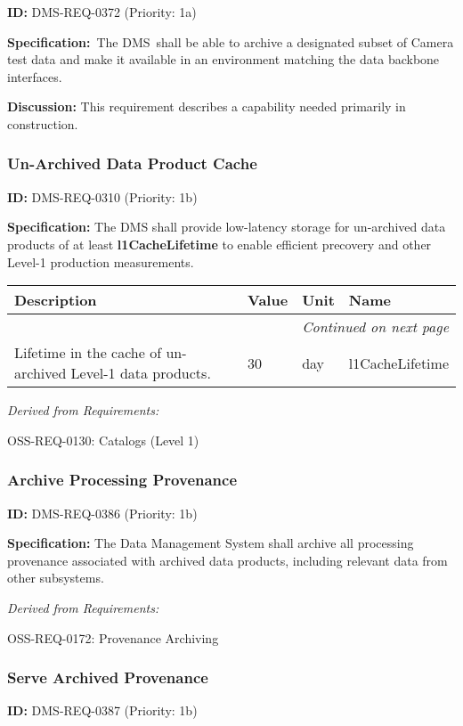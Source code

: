\documentclass[SE,toc,lsstdraft]{lsstdoc}
\makeatletter
\newcommand{\paramname}[1]{\hspace{0pt}#1}
\newcommand{\unitname}[1]{\hspace{0pt}#1}
\newenvironment{parameters}[0]{%
\setlength\LTleft{0pt}
\setlength\LTright{\fill}
\begin{small}
\begin{longtable}[]{|p{0.49\textwidth}|l|p{0.6in}|p{1.70in}@{}|}

\hline \textbf{Description} & \textbf{Value} & \textbf{Unit} & \textbf{Name} \\ \hline
\endhead

\hline \multicolumn{4}{r}{\emph{Continued on next page}} \\
\endfoot

\hline\hline
\endlastfoot
}{%
\hline
\end{longtable}
\end{small}
}
\makeatother
\begin{document}
\label{DMS-REQ-0372}
\textbf{ID:} DMS-REQ-0372 (Priority: 1a)

\textbf{Specification:} The DMS shall be able to archive a designated subset of Camera test data and make it available in an environment matching the data backbone interfaces.

\textbf{Discussion:}
This requirement describes a capability needed primarily in construction.

\subsubsection{Un-Archived Data Product Cache}

\label{DMS-REQ-0310}
\textbf{ID:} DMS-REQ-0310 (Priority: 1b)

\textbf{Specification:} The DMS shall provide low-latency storage for un-archived data products of at least \textbf{l1CacheLifetime }to enable efficient precovery and other Level-1 production measurements.

\begin{parameters}
Lifetime in the cache of un-archived Level-1 data products.
&
30
&
\unitname{%
day
}
&
\paramname{%
l1CacheLifetime
} \\\hline
\end{parameters}

\emph{Derived from Requirements:}

OSS-REQ-0130:
Catalogs (Level 1) \newline

\subsubsection{Archive Processing Provenance}

\label{DMS-REQ-0386}
\textbf{ID:} DMS-REQ-0386 (Priority: 1b)

\textbf{Specification:}
The Data Management System shall archive all processing provenance associated with archived data products, including relevant data from other subsystems.

\emph{Derived from Requirements:}

OSS-REQ-0172:
Provenance Archiving \newline

\subsubsection{Serve Archived Provenance}

\label{DMS-REQ-0387}
\textbf{ID:} DMS-REQ-0387 (Priority: 1b)
\end{document}
